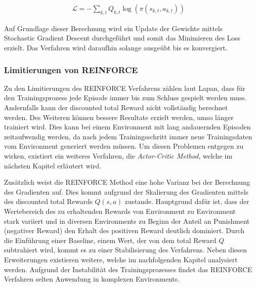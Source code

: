 \documentclass[11pt]{scrartcl}
\begin{document}
\begin{align}
\mathcal{L}=-\sum_{k,t}Q_{k,t}\log(\pi(s_{k,t},a_{k,t}))
\label{aln:reinforce-loss}
\end{align}

Auf Grundlage dieser Berechnung wird ein Update der Gewichte mittels Stochastic
Gradient Descent durchgeführt und somit das Minimieren des Loss erzielt. Das Verfahren
wird daraufhin solange ausgeübt bis es konvergiert.

\subsubsection{Limitierungen von REINFORCE}
\label{sec:limit-reinforce}
Zu den Limitierungen des REINFORCE Verfahrens zählen laut Lapan\cite[~S.252]{L2018}, dass für den
Trainingsprozess jede Episode immer bis zum Schluss gespielt werden muss. Andernfalls kann der
discounted total Reward nicht vollständig berechnet werden. Des Weiteren können bessere Resultate
erzielt werden, umso länger trainiert wird. Dies kann bei einem Environment mit lang andauernden
Episoden zeitaufwendig werden, da nach jedem Trainingsschritt immer neue Trainingsdaten vom
Environment generiert werden müssen. Um diesen Problemen entgegen zu wirken, existiert ein weiteres
Verfahren, die \textit{Actor-Critic Method}, welche im nächsten Kapitel erläutert wird. 

Zusätzlich weist die REINFORCE Method eine hohe Varianz bei der Berechnung des Gradienten auf.
Dies kommt aufgrund der Skalierung des Gradienten mittels des discounted total Rewards $Q(s,a)$ zustande.
Hauptgrund dafür ist, dass der Wertebereich des zu erhaltenden Rewards von Environment zu Environment
stark variiert und in diversen Environments zu Beginn der Anteil an Punishment (negativer Reward) den
Erhalt des positiven Reward deutlich dominiert. Durch die Einführung einer Baseline, einem Wert, der
von dem total Reward $Q$ subtrahiert wird, kommt es zu einer Stabilisierung des Verfahrens. Neben
diesen Erweiterungen existieren weitere, welche im nachfolgenden Kapitel analysiert werden. Aufgrund
der Instabilität des Trainingsprozesses findet das REINFORCE Verfahren selten Anwendung in komplexen
Environments.   
\newpage
\end{document}
